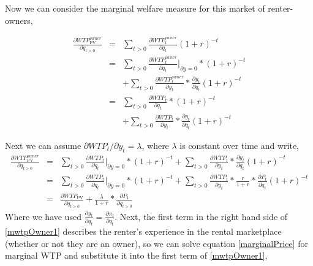 \documentclass[ecta,nameyear,draft]{econsocart}
\theoremstyle{plain}
\theoremstyle{remark}
\begin{document}
Now we can consider the marginal welfare measure for this market of renter-owners,

\begin{eqnarray}
	\frac{\partial \mathit{WTP}^{\mathit{owner}}_{\mathrm{PV}}}{\partial q_{t>0}}&=&\sum_{t>0} \frac{\partial \mathit{WTP}^{\mathit{owner}}_t}{\partial q_t}(1+r)^{-t} \nonumber\\
	&=&\sum_{t>0}\frac{\partial \mathit{WTP}_t^{\mathit{owner}}}{\partial q_t}|_{\partial y=0}*(1+r)^{-t} \nonumber\\
	&& +\sum_{t>0}\frac{\partial \mathit{WTP}_t^{\mathit{owner}}}{\partial y_t}*\frac{\partial y_t}{\partial q_t}(1+r)^{-t} \nonumber\\
	&=&\sum_{t>0}\frac{\partial \mathit{WTP}_t}{\partial q_t}*(1+r)^{-t}\nonumber\\
	&& +\sum_{t>0}\frac{\partial \mathit{WTP}_t}{\partial y_t}*\frac{\partial y_t}{\partial q_t}(1+r)^{-t} \nonumber
\end{eqnarray}

Next we can assume $\partial \mathit{WTP}_t/\partial y_t=\lambda$, where $\lambda$ is constant over time and write,
\begin{eqnarray}
	\frac{\partial \mathit{WTP}^{\mathit{owner}}_{\mathrm{PV}}}{\partial q_{t>0}} 
	&=& \sum_{t>0}\frac{\partial \mathit{WTP}_t}{\partial q_t}|_{\partial y=0}*(1+r)^{-t} +
	\sum_{t>0}\frac{\partial \mathit{WTP}_t}{\partial y_t}*\frac{\partial y_t}{\partial q_t}(1+r)^{-t} \label{mwtpOwner0}\\
	&=& \sum_{t>0}\frac{\partial \mathit{WTP}_t}{\partial q_t}|_{\partial y=0}*(1+r)^{-t} +
	 \sum_{t>0}\frac{\partial \mathit{WTP}_t}{\partial y_t}*\frac{r}{1+r}*\frac{\partial P_t}{\partial q_t}(1+r)^{-t} \nonumber\\
	&=&\frac{\partial \mathit{WTP_{\mathrm{PV}}}}{\partial q_{t>0}} + \frac{\lambda}{1+r}*\frac{\partial P_1}{\partial q_{t>0}} \label{mwtpOwner1}
\end{eqnarray}
Where we have used $\frac{\partial y_t}{\partial q_t}=\frac{\partial \pi_t}{\partial q_t}$. Next, the first term in the right hand side of \ref{mwtpOwner1} describes the renter's experience in the rental marketplace (whether or not they are an owner), so we can solve equation \ref{marginalPrice} for marginal WTP and substitute it into the first term of \ref{mwtpOwner1},
\end{document}
